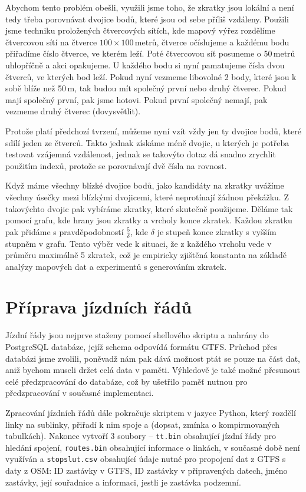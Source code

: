 Abychom tento problém obešli, využili jsme toho, že zkratky jsou lokální a není
tedy třeba porovnávat dvojice bodů, které jsou od sebe příliš vzdáleny. Použili
jsme techniku proložených čtvercových sítích, kde mapový výřez rozdělíme
čtvercovou sítí na čtverce $100\times100$\,metrů, čtverce očíslujeme a každému
bodu přiřadíme číslo čtverce, ve kterém leží. Poté čtvercovou síť posuneme o
50\,metrů uhlopříčně a akci opakujeme. U každého bodu si nyní pamatujeme čísla
dvou čtverců, ve kterých bod leží. Pokud nyní vezmeme libovolné 2 body, které
jsou k sobě blíže než 50\,m, tak budou mít společný první nebo druhý čtverec.
Pokud mají společný první, pak jsme hotovi. Pokud první společný nemají, pak
vezmeme druhý čtverec (\TODO dovysvětlit).

Protože platí předchozí tvrzení, můžeme nyní vzít vždy jen ty dvojice bodů,
které sdílí jeden ze čtverců. Takto jednak získáme méně dvojic, u kterých je
potřeba testovat vzájemná vzdálenost, jednak se takovýto dotaz dá snadno
zrychlit použitím indexů, protože se porovnávají dvě čísla na rovnost. 

Když máme všechny blízké dvojice bodů, jako kandidáty na zkratky uvážíme
všechny úsečky mezi blízkými dvojicemi, které neprotínají žádnou překážku. Z
takovýchto dvojic pak vybíráme zkratky, které skutečně použijeme. Děláme
tak pomocí grafu, kde hrany jsou zkratky a vrcholy konce zkratek. Každou zkratku
pak přidáme s pravděpodobností $\frac{5}{\delta}$, kde $\delta$ je stupeň konce
zkratky s vyšším stupněm v grafu. Tento výběr vede k situaci, že z každého
vrcholu vede v průměru maximálně 5 zkratek, což je empiricky zjištěná konstanta
na základě analýzy mapových dat a experimentů s generováním zkratek.

\section{Příprava jízdních řádů}
Jízdní řády jsou nejprve staženy pomocí shellového skriptu a nahrány do
PostgreSQL databáze, jejíž schema odpovídá formátu GTFS. Průchod přes databázi
jsme zvolili, poněvadž nám pak dává možnost ptát se pouze na část dat,
aniž bychom museli držet celá data v paměti. Výhledově je také možné přesunout
celé předzpracování do databáze, což by ušetřilo paměť nutnou pro předzpracování
v současné implementaci.

Zpracování jízdních řádů dále pokračuje skriptem v jazyce Python, který rozdělí
linky na sublinky, přiřadí k nim spoje a (\TODO dopsat, zmínka o kompirmovaných
tabulkách). Nakonec vytvoří 3 soubory -- {\tt tt.bin} obsahující jízdní řády pro
hledání spojení, {\tt routes.bin} obsahující informace o linkách, v současné
době není využíván a {\tt stopslut.csv} obsahující údaje nutné pro propojení dat
z GTFS s daty z OSM: ID zastávky v GTFS, ID zastávky v připravených datech,
jméno zastávky, její souřadnice a informaci, jestli je zastávka podzemní. 


